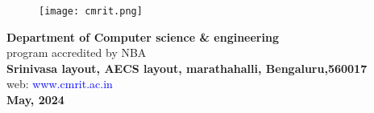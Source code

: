 \documentclass{article}
\begin{document}
\vspace{0.5cm}

\begin{figure}[h]
    \centering
    \texttt{[image: cmrit.png]}
\end{figure}

\textbf{Department of Computer science \& engineering}\\
program accredited by NBA\\
\textbf{Srinivasa layout, AECS layout, marathahalli, Bengaluru,560017}\\
web: \textcolor{blue}{www.cmrit.ac.in}\\

\textbf{May, 2024}
\end{document}
